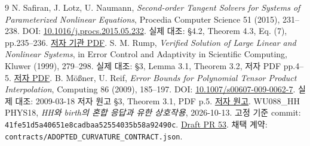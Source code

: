 \tableofcontents
\newpage




\begin{thebibliography}{9}
N. Safiran, J. Lotz, U. Naumann,
\emph{Second-order Tangent Solvers for Systems of Parameterized Nonlinear Equations},
Procedia Computer Science 51 (2015), 231--238.
DOI: \href{https://doi.org/10.1016/j.procs.2015.05.232}{10.1016/j.procs.2015.05.232}.
실제 대조: §4.2, Theorem 4.3, Eq. (7), pp.235--236.
\href{https://publications.rwth-aachen.de/record/569704/files/569704.pdf}{저자 기관 PDF}.
S. M. Rump,
\emph{Verified Solution of Large Linear and Nonlinear Systems},
in Error Control and Adaptivity in Scientific Computing, Kluwer (1999), 279--298.
실제 대조: §3, Lemma 3.1, Theorem 3.2, 저자 PDF pp.4--5.
\href{https://www.tuhh.de/ti3/paper/rump/Ru99d.pdf}{저자 PDF}.
B. Mößner, U. Reif,
\emph{Error Bounds for Polynomial Tensor Product Interpolation},
Computing 86 (2009), 185--197.
DOI: \href{https://doi.org/10.1007/s00607-009-0062-7}{10.1007/s00607-009-0062-7}.
실제 대조: 2009-03-18 저자 원고 §3, Theorem 3.1, PDF p.5.
\href{https://www.mathematik.tu-darmstadt.de/media/mathematik/forschung/preprint/preprints/2580.pdf}{저자 원고}.
WU088\_HH PHYS18, \emph{HH와 birth의 혼합 응답과 유한 상호작용},
2026-10-13. 고정 기준 commit:
\texttt{41fe51d5a40651e8cadbaa52554035b58a92490c}.
\href{https://github.com/cosmosapjw-quantum/WU088_HH/pull/53}{Draft PR 53}.
채택 계약: \texttt{contracts/ADOPTED\_CURVATURE\_CONTRACT.json}.
\end{thebibliography}

